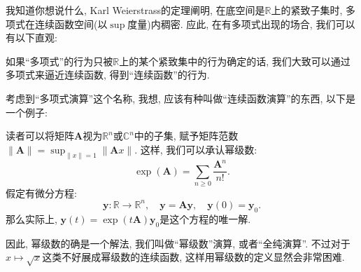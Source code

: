\documentclass{MeasureClay}
\begin{document}
我知道你想说什么, Karl Weierstrass的定理阐明, 在底空间是$\mathbb R$上的紧致子集时, 多项式在连续函数空间(以$\sup$度量)内稠密. 应此, 在有多项式出现的场合, 我们可以有以下直观:

\begin{center}
    \kaishu 如果``多项式''的行为只被$\mathbb R$上的某个紧致集中的行为确定的话, 我们大致可以通过多项式来逼近连续函数, 得到``连续函数''的行为.
\end{center}

考虑到``多项式演算''这个名称, 我想, 应该有种叫做``连续函数演算''的东西, 以下是一个例子:

\begin{example}[矩阵指数]
    读者可以将矩阵$\bm A$视为$\mathbb{R} ^n$或$\mathbb{C} ^n$中的子集, 赋予矩阵范数$\|\bm{A}\| = \sup_{\|x\|=1}\|\bm Ax\|$. 这样, 我们可以承认幂级数:
    \[\exp (\bm A) = \sum_{n\geqslant 0} \frac{\bm A^n}{n!}.\]
    假定有微分方程:
    \[\bm y\colon\mathbb{R} \to\mathbb{R} ^n,\quad\bm y = \bm{Ay},\quad\bm y(0) = \bm y_0. \]
    那么实际上, $\bm y(t) = \exp(t\bm A)\bm y_0 $是这个方程的唯一解.
\end{example}
因此, 幂级数的确是一个解法, 我们叫做``幂级数''演算, 或者``全纯演算''. 不过对于$x\mapsto \sqrt{x}$这类不好展成幂级数的连续函数, 这样用幂级数的定义显然会非常困难.
\end{document}
